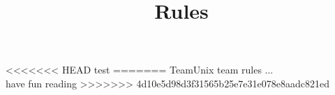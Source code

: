 \documentclass[10pt,a4paper]{article}
\title{Rules}
\begin{document}
<<<<<<< HEAD
test
=======
TeamUnix team rules ...  \\have fun reading
>>>>>>> 4d10e5d98d3f31565b25e7e31e078e8aadc821ed
\end{document}
